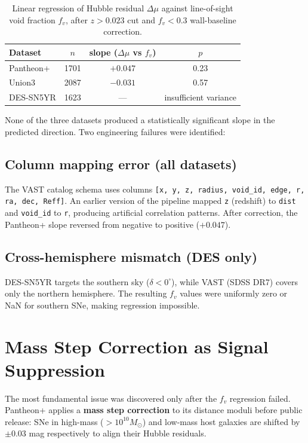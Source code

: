 \documentclass[11pt]{article}
\begin{document}
\begin{table}[h]
\centering
\begin{tabular}{lccc}
\toprule
Dataset & $n$ & slope ($\Delta\mu$ vs $f_v$) & $p$ \\
\midrule
Pantheon+ & 1701 & $+0.047$ & 0.23 \\
Union3 & 2087 & $-0.031$ & 0.57 \\
DES-SN5YR & 1623 & --- & insufficient variance \\
\bottomrule
\end{tabular}
\caption{Linear regression of Hubble residual $\Delta\mu$ against line-of-sight void fraction $f_v$,
after $z>0.023$ cut and $f_v<0.3$ wall-baseline correction.}
\label{tab:fv-regression}
\end{table}

None of the three datasets produced a statistically significant slope
in the predicted direction. Two engineering failures were identified:

\subsection{Column mapping error (all datasets)}

The VAST catalog schema uses columns
\texttt{[x, y, z, radius, void\_id, edge, r, ra, dec, Reff]}.
An earlier version of the pipeline mapped \texttt{z} (redshift)
to \texttt{dist} and \texttt{void\_id} to \texttt{r}, producing
artificial correlation patterns. After correction, the Pantheon+
slope reversed from negative to positive ($+0.047$).

\subsection{Cross-hemisphere mismatch (DES only)}

DES-SN5YR targets the southern sky ($\delta < 0^\circ$), while
VAST (SDSS DR7) covers only the northern hemisphere.
The resulting $f_v$ values were uniformly zero or NaN for
southern SNe, making regression impossible.

\section{Mass Step Correction as Signal Suppression}
\label{sec:mass-step}

The most fundamental issue was discovered only after the $f_v$
regression failed. Pantheon+ applies a \textbf{mass step correction}
to its distance moduli before public release: SNe in high-mass
($> 10^{10} M_\odot$) and low-mass host galaxies are shifted by
$\pm 0.03$ mag respectively to align their Hubble residuals.
\end{document}
